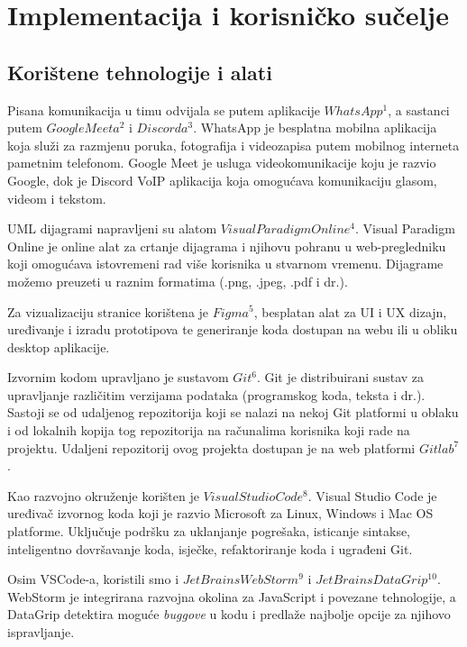 \chapter{Implementacija i korisničko sučelje}
		
		
		\section{Korištene tehnologije i alati}
		Pisana komunikacija u timu odvijala se putem aplikacije $WhatsApp^{1}$, a sastanci putem $Google Meeta^{2}$ i $Discorda^{3}$. WhatsApp je besplatna mobilna aplikacija koja služi za razmjenu poruka, fotografija i videozapisa putem mobilnog interneta pametnim telefonom. Google Meet je usluga videokomunikacije koju je razvio Google, dok je Discord VoIP aplikacija koja omogućava komunikaciju glasom, videom i tekstom.
		
		UML dijagrami napravljeni su alatom $Visual Paradigm Online^{4}$. Visual Paradigm Online je online alat za crtanje dijagrama i njihovu pohranu u web-pregledniku koji omogućava istovremeni rad više korisnika u stvarnom vremenu. Dijagrame možemo preuzeti u raznim formatima (.png, .jpeg, .pdf i dr.).
		
		Za vizualizaciju stranice korištena je $Figma^{5}$, besplatan alat za UI i UX dizajn, uređivanje i izradu	prototipova te generiranje koda dostupan na webu ili u obliku desktop aplikacije.
		
		Izvornim kodom upravljano je sustavom $Git^{6}$. Git je distribuirani sustav za upravljanje različitim	verzijama podataka (programskog koda, teksta i dr.). Sastoji se od udaljenog repozitorija koji se nalazi na nekoj Git platformi u oblaku i od lokalnih kopija tog repozitorija na računalima korisnika koji rade na projektu. Udaljeni repozitorij ovog projekta dostupan je na web platformi $Gitlab^{7}$.
		
		Kao razvojno okruženje korišten je $Visual Studio Code^{8}$. Visual Studio Code
		je uređivač izvornog koda koji je razvio Microsoft za Linux, Windows i Mac OS platforme. Uključuje podršku za uklanjanje pogrešaka, isticanje sintakse, inteligentno dovršavanje koda, isječke, refaktoriranje koda i ugrađeni Git.
		
		Osim VSCode-a, koristili smo i $JetBrains WebStorm^{9}$ i $JetBrains DataGrip^{10}$. WebStorm je integrirana razvojna okolina za JavaScript i povezane tehnologije, a DataGrip detektira moguće \textit{buggove} u kodu i predlaže najbolje opcije za njihovo ispravljanje.
		
